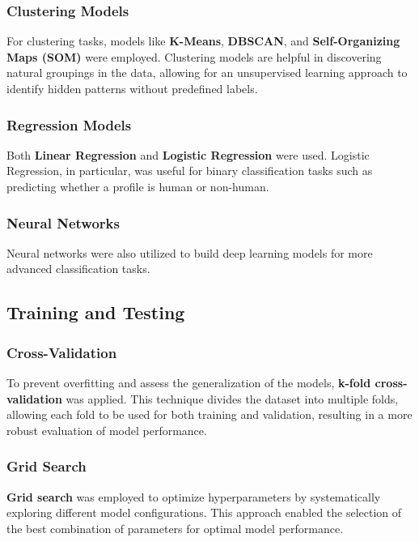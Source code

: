 \documentclass[a4paper,11pt]{article}
\begin{document}
\subsubsection*{Clustering Models}
For clustering tasks, models like \textbf{K-Means}, \textbf{DBSCAN}, and \textbf{Self-Organizing Maps (SOM)} were employed. Clustering models are helpful in discovering natural groupings in the data, allowing for an unsupervised learning approach to identify hidden patterns without predefined labels.

\subsubsection*{Regression Models}
Both \textbf{Linear Regression} and \textbf{Logistic Regression} were used. Logistic Regression, in particular, was useful for binary classification tasks such as predicting whether a profile is human or non-human.

\subsubsection*{Neural Networks}
Neural networks were also utilized to build deep learning models for more advanced classification tasks.

\subsection{Training and Testing}
\subsubsection*{Cross-Validation}
To prevent overfitting and assess the generalization of the models, \textbf{k-fold cross-validation} was applied. This technique divides the dataset into multiple folds, allowing each fold to be used for both training and validation, resulting in a more robust evaluation of model performance.

\subsubsection*{Grid Search}
\textbf{Grid search} was employed to optimize hyperparameters by systematically exploring different model configurations. This approach enabled the selection of the best combination of parameters for optimal model performance.
\end{document}
